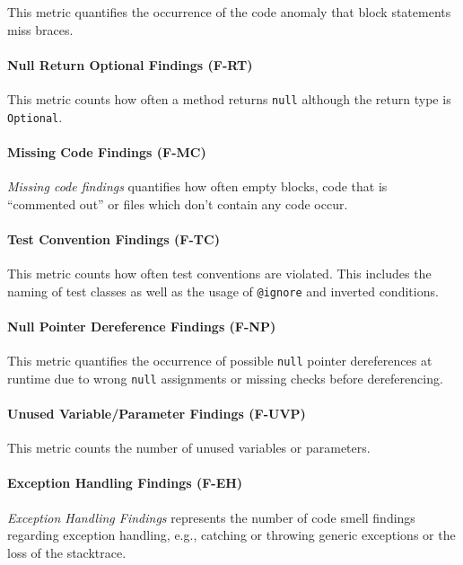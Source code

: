 \documentclass{scrartcl}
\begin{document}
This metric quantifies the occurrence of the code anomaly that block statements
miss braces.

\paragraph{Null Return Optional Findings (F-RT)}

This metric counts how often a method returns \texttt{null} although the return
type is \texttt{Optional}.

\paragraph{Missing Code Findings (F-MC)}

\emph{Missing code findings} quantifies how often empty blocks, code that is
\enquote{commented out} or files which don't contain any code occur.

\paragraph{Test Convention Findings (F-TC)}

This metric counts how often test conventions are violated. This includes the
naming of test classes as well as the usage of \texttt{@ignore} and inverted
conditions.

\paragraph{Null Pointer Dereference Findings (F-NP)}

This metric quantifies the occurrence of possible \texttt{null} pointer
dereferences at runtime due to wrong \texttt{null} assignments or missing checks
before dereferencing.

\paragraph{Unused Variable/Parameter Findings (F-UVP)}

This metric counts the number of unused variables or parameters.

\paragraph{Exception Handling Findings (F-EH)}

\emph{Exception Handling Findings} represents the number of code smell findings
regarding exception handling, e.g., catching or throwing generic exceptions or
the loss of the stacktrace.
\end{document}
